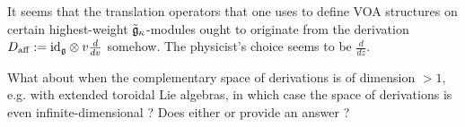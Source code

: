        \begin{remark}
            It seems that the translation operators that one uses to define VOA structures on certain highest-weight $\tilde{\mathfrak{g}}_{\kappa}$-modules ought to originate from the derivation $D_{\aff} := \id_{\g} \tensor v\frac{d}{dv}$ somehow. The physicist's choice seems to be $\frac{d}{dz}$.  
        \end{remark}
        \begin{question}
            What about when the complementary space of derivations is of dimension $ > 1$, e.g. with extended toroidal Lie algebras, in which case the space of derivations is even infinite-dimensional ? Does either \cite{moody_rao_yokonuma_vertex_representations_of_toroidal_lie_algebras} or \cite{moody_rao_n_toroidal_vertex_representations} provide an answer ?
        \end{question}